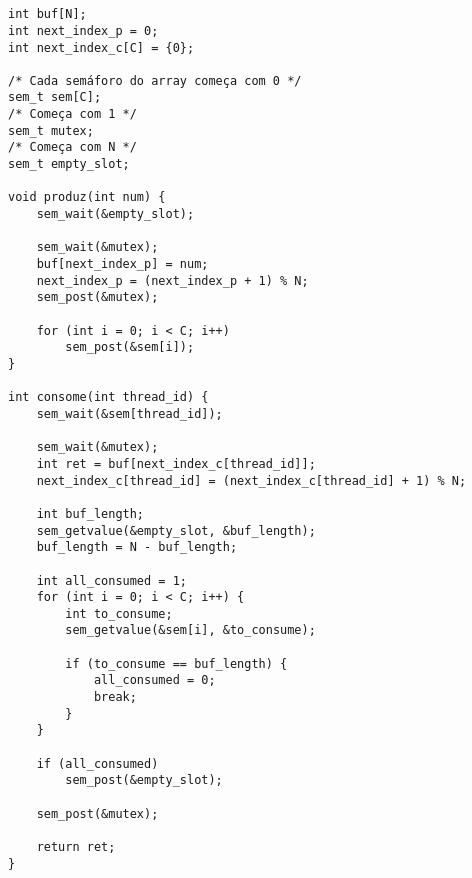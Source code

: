 \documentclass[12pt]{article}
\begin{document}
\section{}
\begin{verbatim}
int buf[N];
int next_index_p = 0;
int next_index_c[C] = {0};

/* Cada semáforo do array começa com 0 */
sem_t sem[C];
/* Começa com 1 */
sem_t mutex;
/* Começa com N */
sem_t empty_slot;

void produz(int num) {
	sem_wait(&empty_slot);

	sem_wait(&mutex);
	buf[next_index_p] = num;
	next_index_p = (next_index_p + 1) % N;
	sem_post(&mutex);

	for (int i = 0; i < C; i++)
		sem_post(&sem[i]);
}

int consome(int thread_id) {
	sem_wait(&sem[thread_id]);

	sem_wait(&mutex);
	int ret = buf[next_index_c[thread_id]];
	next_index_c[thread_id] = (next_index_c[thread_id] + 1) % N;

	int buf_length;
	sem_getvalue(&empty_slot, &buf_length);
	buf_length = N - buf_length;

	int all_consumed = 1;
	for (int i = 0; i < C; i++) {
		int to_consume;
		sem_getvalue(&sem[i], &to_consume);

		if (to_consume == buf_length) {
			all_consumed = 0;
			break;
		}
	}

	if (all_consumed)
		sem_post(&empty_slot);

	sem_post(&mutex);

	return ret;
}
\end{verbatim}
\end{document}
